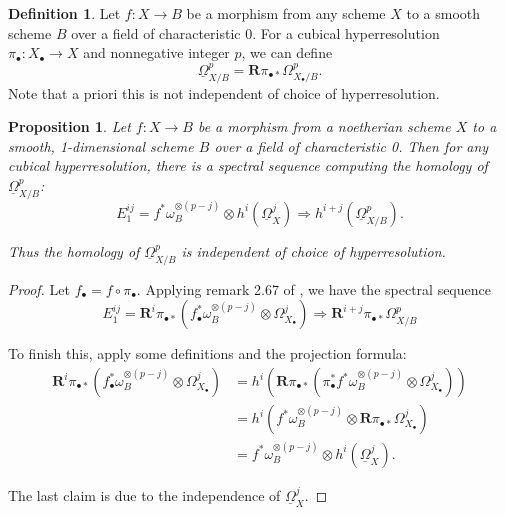 \documentclass{report}
\newtheorem{prop}[theorem]{Proposition}
\theoremstyle{definition}
\newtheorem{definition}[theorem]{Definition}
\newcommand{\bR}{\textbf{R}}
\newcommand{\DB}{\underline{\Omega}}
\begin{document}
\begin{definition}
	Let $f : X \rightarrow B$ be a morphism from any scheme $X$ to a smooth scheme $B$ over a field of characteristic 0.
	For a cubical hyperresolution $\pi_\bullet : X_\bullet \rightarrow X$ and nonnegative integer $p$, we can define
	\[
		\DB_{X/B}^p = \bR \pi_{\bullet *} \Omega_{X_\bullet / B}^p.
	\]
	Note that a priori this is not independent of choice of hyperresolution.
\end{definition}

\begin{prop}
	Let $f : X \rightarrow B$ be a morphism from a noetherian scheme $X$ to a smooth, 1-dimensional scheme $B$ over a field of characteristic 0.
	Then for any cubical hyperresolution, there is a spectral sequence computing the homology of $\DB_{X/B}^p$:
	\[
		E_1^{ij} = f^* \omega_B^{\otimes (p - j)} \otimes h^i(\DB_X^j) \Rightarrow h^{i+j}(\DB_{X/B}^p).
	\]
	
	Thus the homology of $\DB_{X/B}^p$ is independent of choice of hyperresolution.
\end{prop}
\begin{proof}
	Let $f_\bullet = f \circ \pi_\bullet$.
	Applying remark 2.67 of \cite{Huybrechts2006}, we have the spectral sequence
	\[
		E_1^{ij} = \bR^i \pi_{\bullet *} (f_\bullet^* \omega_B^{\otimes(p-j)} \otimes \Omega_{X_\bullet}^j) \Rightarrow \bR^{i+j} \pi_{\bullet *} \Omega_{X/B}^p
	\]
	
	To finish this, apply some definitions and the projection formula:
	\begin{align*}
		\bR^i \pi_{\bullet *} (f_\bullet^* \omega_B^{\otimes(p-j)} \otimes \Omega_{X_\bullet}^j) &= h^i (\bR \pi_{\bullet *} (\pi_\bullet^* f^* \omega_B^{\otimes(p-j)} \otimes \Omega_{X_\bullet}^j)) \\
		&= h^i (f^* \omega_B^{\otimes(p-j)} \otimes \bR \pi_{\bullet *}\Omega_{X_\bullet}^j) \\
		&= f^* \omega_B^{\otimes (p - j)} \otimes h^i(\DB_X^j).
	\end{align*}
	
	The last claim is due to the independence of $\DB_X^j$.
\end{proof}

{}

\end{document}
